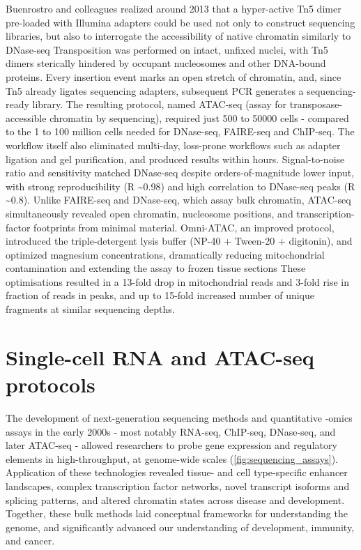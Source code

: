 Buenrostro and colleagues realized around 2013 that a hyper-active Tn5 dimer pre-loaded with Illumina adapters could be used not only to construct sequencing libraries, but also to interrogate the accessibility of native chromatin similarly to DNase-seq Transposition was performed on intact, unfixed nuclei, with Tn5 dimers sterically hindered by occupant nucleosomes and other DNA-bound proteins. Every insertion event marks an open stretch of chromatin, and, since Tn5 already ligates sequencing adapters, subsequent PCR generates a sequencing-ready library. The resulting protocol, named ATAC-seq (assay for transposase-accessible chromatin by sequencing), required just \num{500} to \num{50000} cells - compared to the 1 to 100 million cells needed for DNase-seq, FAIRE-seq and ChIP-seq. The workflow itself also eliminated multi-day, loss-prone workflows such as adapter ligation and gel purification, and produced results within hours. Signal-to-noise ratio and sensitivity matched DNase-seq despite orders-of-magnitude lower input, with strong reproducibility (R \textasciitilde 0.98) and high correlation to DNase-seq peaks (R \textasciitilde 0.8). Unlike FAIRE-seq and DNase-seq, which assay bulk chromatin, ATAC-seq simultaneously revealed open chromatin, nucleosome positions, and transcription-factor footprints from minimal material. Omni-ATAC, an improved protocol, introduced the triple-detergent lysis buffer (NP-40 + Tween-20 + digitonin), and optimized magnesium concentrations, dramatically reducing mitochondrial contamination and extending the assay to frozen tissue sections These optimisations resulted in a 13-fold drop in mitochondrial reads and 3-fold rise in fraction of reads in peaks, and up to 15-fold increased number of unique fragments at similar sequencing depths.

\section{Single-cell RNA and ATAC-seq protocols}
\label{sect:single_cell_sequencing_tech}
The development of next-generation sequencing methods and quantitative -omics assays in the early 2000s - most notably RNA-seq, ChIP-seq, DNase-seq, and later ATAC-seq - allowed researchers to probe gene expression and regulatory elements in high-throughput, at genome-wide scales (\autoref{fig:sequencing_assays}). Application of these technologies revealed tissue- and cell type-specific enhancer landscapes, complex transcription factor networks, novel transcript isoforms and splicing patterns, and altered chromatin states across disease and development. Together, these bulk methods laid conceptual frameworks for understanding the genome, and significantly advanced our understanding of development, immunity, and cancer.

